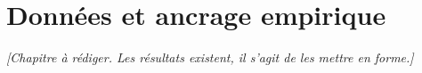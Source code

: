 \chapter{Données et ancrage empirique}
\label{ch:donnees}

\textit{[Chapitre à rédiger. Les résultats existent, il s'agit de les mettre en forme.]}

